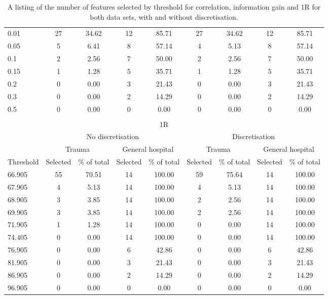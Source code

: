 \begin{table}[htbp]
{\begin{tabular}{lcccccccc}
     0.01 & 27 & 34.62 & 12 & 85.71 & 27 & 34.62 & 12 & 85.71 \\
     0.05 & 5 & 6.41 & 8 & 57.14 & 4 & 5.13 & 8 & 57.14 \\
     0.1 & 2 & 2.56 & 7 & 50.00 & 2 & 2.56 & 7 & 50.00 \\
     0.15 & 1 & 1.28 & 5 & 35.71 & 1 & 1.28 & 5 & 35.71 \\
     0.2 & 0 & 0.00 & 3 & 21.43 & 0 & 0.00 & 3 & 21.43 \\
     0.3 & 0 & 0.00 & 2 & 14.29 & 0 & 0.00 & 2 & 14.29 \\
     0.5 & 0 & 0.00 & 0 & 0.00 & 0 & 0.00 & 0 & 0.00 \\
      &  &  &  &  &  &  &  &  \\
      \multicolumn{9}{c}{1R} \\
       & \multicolumn{4}{c}{No discretisation} & \multicolumn{4}{c}{Discretisation} \\
       \hline
        & \multicolumn{2}{c}{Trauma} & \multicolumn{2}{c}{General hospital} & \multicolumn{2}{c}{Trauma} & \multicolumn{2}{c}{General hospital} \\
        Threshold & Selected & \% of total & Selected & \% of total & Selected & \% of total & Selected & \% of total \\
        \hline
        66.905 & 55 & 70.51 & 14 & 100.00 & 59 & 75.64 & 14 & 100.00 \\
        67.905 & 4 & 5.13 & 14 & 100.00 & 4 & 5.13 & 14 & 100.00 \\
        68.905 & 3 & 3.85 & 14 & 100.00 & 2 & 2.56 & 14 & 100.00 \\
        69.905 & 3 & 3.85 & 14 & 100.00 & 2 & 2.56 & 14 & 100.00 \\
        71.905 & 1 & 1.28 & 14 & 100.00 & 0 & 0.00 & 14 & 100.00 \\
        74.405 & 0 & 0.00 & 14 & 100.00 & 0 & 0.00 & 14 & 100.00 \\
        76.905 & 0 & 0.00 & 6 & 42.86 & 0 & 0.00 & 6 & 42.86 \\
        81.905 & 0 & 0.00 & 3 & 21.43 & 0 & 0.00 & 3 & 21.43 \\
        86.905 & 0 & 0.00 & 2 & 14.29 & 0 & 0.00 & 2 & 14.29 \\
        96.905 & 0 & 0.00 & 0 & 0.00 & 0 & 0.00 & 0 & 0.00
        \end{tabular}
}
\caption{A listing of the number of features selected by threshold for correlation, information gain and 1R for both data sets, with and without discretisation.}
\label{tab:features-selected-threshold}
\end{table}
